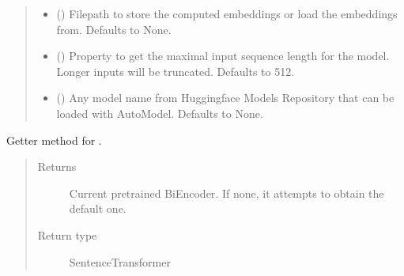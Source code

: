 \documentclass[letterpaper,10pt,english]{sphinxmanual}
\begin{document}
\begin{fulllineitems}
\begin{fulllineitems}
\begin{quote}
\begin{description}
\begin{itemize}
\item {} 
 (\sphinxstyleliteralemphasis{\sphinxupquote{, }}) \textendash{} Filepath to store the computed embeddings
or load the embeddings from. Defaults to None.

\item {} 
 (\sphinxstyleliteralemphasis{\sphinxupquote{, }}) \textendash{} Property to get the maximal input sequence
length for the model. Longer inputs will be truncated. Defaults to 512.

\item {} 
 (\sphinxstyleliteralemphasis{\sphinxupquote{, }}) \textendash{} Any model name from Huggingface Models
Repository that can be loaded with AutoModel. Defaults to None.

\end{itemize}

\end{description}\end{quote}

\end{fulllineitems}


\begin{fulllineitems}
\label{\detokenize{code:lexical_search.TfIdfSearch.biencoder}}
Getter method for .
\begin{quote}\begin{description}
\item[{Returns}] \leavevmode
Current pretrained Bi\sphinxhyphen{}Encoder. If none, it attempts to obtain
the default one.

\item[{Return type}] \leavevmode
SentenceTransformer

\end{description}\end{quote}


\end{fulllineitems}
\end{fulllineitems}
\end{document}
